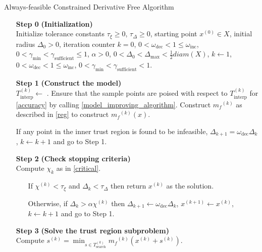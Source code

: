 \documentclass{article}
\theoremstyle{case}
\newcommand{\domain}{X}
\newcommand{\modelk}{{{m}_f}^{(k)}}
\newcommand{\iteratek}{{x}^{(k)}}
\newcommand{\trialk}{{{s}^{(k)}}}
\newcommand{\outertrk}{{T_{\text{out}}^{(k)}}}
\newcommand{\searchtrk}{{T_{\text{search}}^{(k)}}}
\newcommand{\sampletrk}{{T_{\text{interp}}^{(k)}}}
\newcommand{\feasiblek}{{F}^{(k)}}
\newcommand{\chik}{{\chi^{(k)}}}
\newcommand{\omegainc}{\omega_{\text{inc}}}
\newcommand{\omegadec}{\omega_{\text{dec}}}
\newcommand{\gammasm}{\gamma_{\text{min}}}
\newcommand{\gammabi}{\gamma_{\text{sufficient}}}
\newcommand{\dk}{\Delta_k}
\begin{document}
\begin{algorithm}[H]
    \caption{Always-feasible Constrained Derivative Free Algorithm}
    \label{constrained_dfo}
    \begin{itemize}
        \item[\textbf{Step 0}] \textbf{(Initialization)} \\
            Initialize tolerance constants 
            $\tau_{\xi} \ge 0$,
            $\tau_{\Delta} \ge 0$,
            starting point $x^{(0)} \in \domain$,
            initial radius $\Delta_0 > 0$,
            iteration counter $k=0$,
            $0 < \omegadec < 1 \le \omegainc$,
            $0 < \gammasm < \gammabi \le 1$,
            $\alpha > 0$,
            $0 < \Delta_0 < \Delta_{\text{max}} < \frac 1 2 diam(\domain)$,
            $k \gets 1$,
            $0 < \omegadec < 1 \le \omegainc$,
            $0 < \gammasm < \gammabi < 1$.
            
        \item[\textbf{Step 1}] \textbf{(Construct the model)} \\
            $ \sampletrk \gets $ .
            Ensure that the sample points are poised with respect to $ \sampletrk $ for \cref{accuracy} by calling \cref{model_improving_algorithm}.
            Construct $\modelk$ as described in \cref{reg} to construct $\modelk(x)$.
            
            If any point in the inner trust region is found to be infeasible, $\Delta_{k+1} = \omegadec\Delta_{k}$, $k \gets k+1$ and go to Step 1.
        
        \item[\textbf{Step 2}] \textbf{(Check stopping criteria)} \\
            Compute $\chi_k$ as in \cref{critical}. \begin{itemize}
                \item[] If $ \chik < \tau_{\xi} $ and $\dk <\tau_{\Delta}$ then return $\iteratek$ as the solution.
                \item[] Otherwise, if $\dk > \alpha \chik$ then 
                $\Delta_{k+1} \gets \omegadec\Delta_{k}$, 
                $x^{(k+1)} \gets \iteratek$,
                $k \gets k+1$ and go to Step 1.
            \end{itemize}
        
        \item[\textbf{Step 3}] \textbf{(Solve the trust region subproblem)} \\
            Compute $\trialk = \min_{s \in \searchtrk} \modelk(\iteratek + \trialk)$.
            

\end{itemize}
\end{algorithm}
\end{document}
